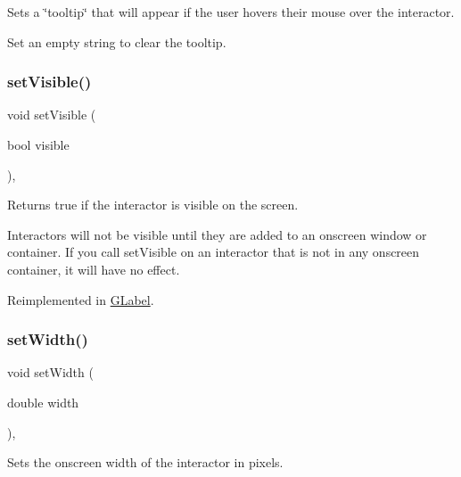Sets a \char`\"{}tooltip\char`\"{} that will appear if the user hovers their mouse over the interactor. 

Set an empty string to clear the tooltip. \mbox{\label{classsgl_1_1GInteractor_a18e44e30b31525a243960ca3928125aa}} 
\subsubsection{\texorpdfstring{set\+Visible()}{setVisible()}}
{\footnotesize\ttfamily void set\+Visible (\begin{DoxyParamCaption}\item[{bool}]{visible }\end{DoxyParamCaption})\hspace{0.3cm}{\ttfamily [virtual]}, {\ttfamily [inherited]}}



Returns true if the interactor is visible on the screen. 

Interactors will not be visible until they are added to an onscreen window or container. If you call set\+Visible on an interactor that is not in any onscreen container, it will have no effect. 

Reimplemented in \mbox{\hyperlink{classsgl_1_1GLabel_afcc2a51afef8e2e61d8d9191386fb93f}{G\+Label}}.

\mbox{\label{classsgl_1_1GInteractor_aa3f3fba4cb131baa8696ba01e3bceca1}} 
\subsubsection{\texorpdfstring{set\+Width()}{setWidth()}}
{\footnotesize\ttfamily void set\+Width (\begin{DoxyParamCaption}\item[{double}]{width }\end{DoxyParamCaption})\hspace{0.3cm}{\ttfamily [virtual]}, {\ttfamily [inherited]}}



Sets the onscreen width of the interactor in pixels. 


